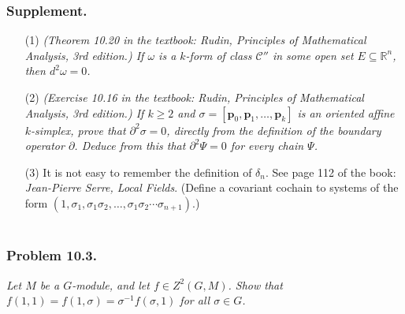 \documentclass{article}
\begin{document}
\subsubsection*{Supplement.}
\begin{enumerate}
\item[(1)]
  \emph{(Theorem 10.20 in the textbook:
  Rudin, Principles of Mathematical Analysis, 3rd edition.)
  If $\omega$ is a $k$-form of class $\mathscr{C}''$
  in some open set $E \subseteq \mathbb{R}^n$, then $d^2 \omega = 0$.}

\item[(2)]
  \emph{(Exercise 10.16 in the textbook:
  Rudin, Principles of Mathematical Analysis, 3rd edition.)
  If $k \geq 2$ and $\sigma = [\mathbf{p}_0,\mathbf{p}_1,\ldots,\mathbf{p}_k]$
  is an oriented affine $k$-simplex, prove that $\partial^2 \sigma = 0$,
  directly from the definition of the boundary operator $\partial$.
  Deduce from this that $\partial^2 \Psi = 0$ for every chain $\Psi$.} 

\item[(3)]
  It is not easy to remember the definition of $\delta_{n}$.
  See page 112 of the book: \emph{Jean-Pierre Serre, Local Fields}.
  (Define a covariant cochain to systems of the form
  $(1, \sigma_1, \sigma_1\sigma_2, \ldots, \sigma_1\sigma_2\cdots\sigma_{n+1})$.) \\\\
\end{enumerate}






\subsubsection*{Problem 10.3.}
\emph{Let $M$ be a $G$-module, and let $f \in Z^2(G,M)$.
Show that $f(1,1) = f(1,\sigma) = \sigma^{-1} f(\sigma, 1)$ for all $\sigma \in G$.} \\
\end{document}

